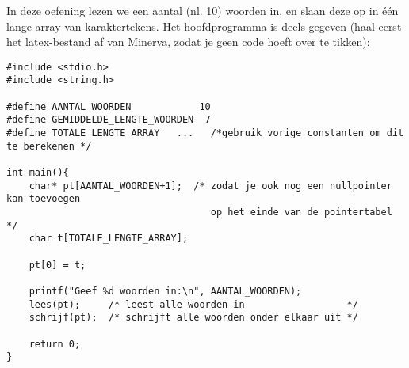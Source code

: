 \beginoef
In deze oefening lezen we een aantal (nl. 10) woorden in, en slaan deze op in \'e\'en lange array
van karaktertekens. Het hoofdprogramma is deels gegeven  (haal eerst het latex-bestand af van Minerva, zodat je geen code hoeft over te tikken):

\begin{verbatim}
#include <stdio.h>
#include <string.h>

#define AANTAL_WOORDEN            10 
#define GEMIDDELDE_LENGTE_WOORDEN  7
#define TOTALE_LENGTE_ARRAY   ...   /*gebruik vorige constanten om dit te berekenen */

int main(){
    char* pt[AANTAL_WOORDEN+1];  /* zodat je ook nog een nullpointer kan toevoegen
                                    op het einde van de pointertabel */
    char t[TOTALE_LENGTE_ARRAY];
	
    pt[0] = t;
	
    printf("Geef %d woorden in:\n", AANTAL_WOORDEN);
    lees(pt);     /* leest alle woorden in                  */
    schrijf(pt);  /* schrijft alle woorden onder elkaar uit */
	
    return 0;
}
\end{verbatim}


